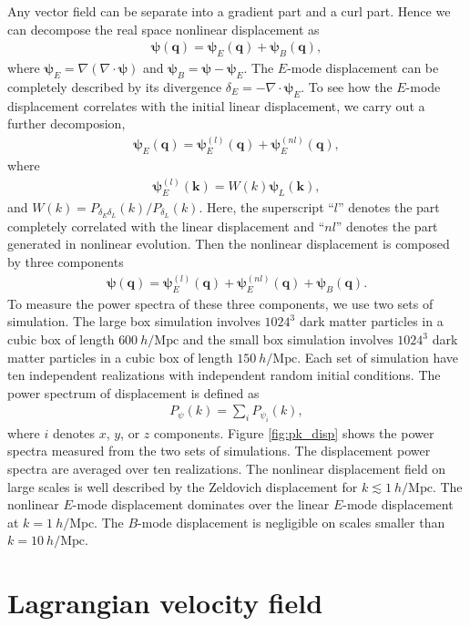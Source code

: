 \documentclass[aps,prx,twocolumn,superscriptaddress,groupedaddress,nofootinbib,amsfont]{revtex4}  %
\newcommand{\mr}{\mathrm}
\newcommand{\bea}{\begin{eqnarray}}
\newcommand{\eea}{\end{eqnarray}}
\newcommand{\bmp}{\bm{\psi}}
\newcommand{\bmk}{\bm{k}}
\newcommand{\bmq}{\bm{q}}
\begin{document}
Any vector field can be separate into a gradient part and a curl part. 
Hence we can decompose the real space nonlinear displacement as
\bea
\bmp(\bmq)=\bmp_E(\bmq)+\bmp_B(\bmq),
\eea
where $\bmp_E=\nabla(\nabla\cdot\bmp)$ and $\bmp_B=\bmp-\bmp_E$.
The $E$-mode displacement can be completely described by its divergence 
$\delta_E=-\nabla\cdot\bmp_E$. 
To see how the $E$-mode displacement correlates with the initial linear 
displacement, we carry out a further decomposion,
\bea
\bmp_E(\bmq)=\bmp_E^{(l)}(\bmq)+\bmp_E^{(nl)}(\bmq),
\eea
where
\bea
\bmp_E^{(l)}(\bmk)=W(k)\bmp_L(\bmk),
\eea
and $W(k)={P_{\delta_E\delta_L}(k)}/{P_{\delta_L}(k)}$.
Here, the superscript ``$l$'' denotes the part completely correlated with the 
linear displacement and ``$nl$'' denotes the part generated in nonlinear 
evolution.
Then the nonlinear displacement is composed by three components
\bea
\bmp(\bmq)=\bmp^{(l)}_E(\bmq)+\bmp^{(nl)}_E(\bmq)+\bmp_B(\bmq).
\eea
To measure the power spectra of these three components, we use two sets of simulation. The large box simulation involves $1024^3$ dark matter particles in a 
cubic box of length $600\ h/\mr{Mpc}$ and the small box simulation involves
$1024^3$ dark matter particles in a cubic box of length $150\ h/\mr{Mpc}$.
Each set of simulation have ten independent realizations with independent random
initial conditions.
The power spectrum of displacement is defined as 
\bea
P_\psi(k)=\sum_iP_{\psi_i}(k),
\eea
where $i$ denotes $x$, $y$, or $z$ components.
Figure \ref{fig:pk_disp} shows the power spectra measured from the two sets of
simulations. The displacement power spectra are averaged over ten realizations.
The nonlinear displacement field on large scales is well described by the 
Zeldovich displacement for $k\lesssim1\ h/\mr{Mpc}$.
The nonlinear $E$-mode displacement dominates over the linear $E$-mode displacement at $k=1\ h/\mr{Mpc}$. The $B$-mode displacement is negligible on scales 
smaller than $k=10\ h/\mr{Mpc}$.


\section{Lagrangian velocity field}
\label{appendix:B}
\end{document}
